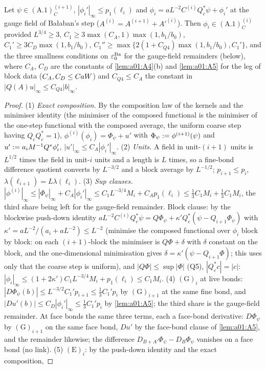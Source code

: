\begin{lemma}\label{lem:a01:GC}
Let $\psi\in(\mathrm{A.1})^{(i+1)}_C$, $|\phi_i'|_\infty\le p_1(\ell_i)$ and $\phi_i=aL^{-2}C^{(i)}Q_c^*\psi+\phi_i'$ at the gauge field of Ba{\l}aban's step ($A^{(i)}=A^{(i+1)}+A'^{(i)}$). Then $\phi_i\in(\mathrm{A.1})^{(i)}_C$ provided $L^{3/4}\ge3$, $C_1\ge3\max(C_A,1)\max(1,b_1/b_0)$, $C_1'\ge3C_D\max(1,b_1/b_0)$, $C_1''\ge\max\{2(1+C_{Q4})\max(1,b_1/b_0),C_1'\}$, and the three smallness conditions on $\varepsilon_0^{\mathrm{Ba}}$ for the gauge-field remainders (below), where $C_A$, $C_D$ are the constants of \cref{lem:a01:A4}(b) and \cref{lem:a01:A5} for the leg of block data ($C_A,C_D\le CaW$) and $C_{Q4}\le C_A$ the constant in $|Q(A)u|_\infty\le C_{Q4}|b|_\infty$.
\end{lemma}
\begin{proof}
(1) \emph{Exact composition.} By the composition law of the kernels and the minimiser identity (the minimiser of the composed functional is the minimiser of the one-step functional with the composed average, the uniform coarse step having $Q_cQ_c^*=1$), $\phi^{(i)}(\phi_i)=\Phi_\psi+u'$ with $\Phi_\psi:=\phi^{(i+1)}(\psi)$ and $u':= a_iM^{-1}Q^*\phi_i'$, $|u'|_\infty\le C_A|\phi_i'|_\infty$. (2) \emph{Units.} A field in unit-$(i+1)$ units is $L^{1/2}$ times the field in unit-$i$ units and a length is $L$ times, so a fine-bond difference quotient converts by $L^{-3/2}$ and a block average by $L^{-1/2}$; $p_{i+1}\le p_i$, $\lambda(\ell_{i+1})=L\lambda(\ell_i)$. (3) \emph{Sup clauses.} $|\phi^{(i)}|_\infty\le|\Phi_\psi|_\infty+C_A|\phi_i'|_\infty\le C_1L^{-3/4}M_i+C_Ap_1(\ell_i)\le\frac13C_1M_i+\frac13C_1M_i$, the third share being left for the gauge-field remainder. Block clause: by the blockwise push-down identity $aL^{-2}C^{(i)}Q_c^*\psi=Q\Phi_\psi+\kappa'Q_c^*(\psi-Q_{i+1}\Phi_\psi)$ with $\kappa'=aL^{-2}/(a_i+aL^{-2})\le L^{-2}$ (minimise the composed functional over $\phi_i$ block by block: on each $(i+1)$-block the minimiser is $Q\Phi+\delta$ with $\delta$ constant on the block, and the one-dimensional minimisation gives $\delta=\kappa'(\psi-Q_{i+1}\Phi)$; this uses only that the coarse step is uniform), and $|Q\Phi|\le\sup|\Phi|$ (Q5), $|Q_c^*c|=|c|$: $|\phi_i|_\infty\le(1+2\kappa')C_1L^{-3/4}M_i+p_1(\ell_i)\le C_1M_i$. (4) $(\mathrm G)_i$ at live bonds: $|D\Phi_\psi(b)|\le L^{-3/2}C_1'p_{i+1}\le\frac13C_1'p_i$ by $(\mathrm G)_{i+1}$ at the same fine bond, and $|Du'(b)|\le C_D|\phi_i'|_\infty\le\frac13C_1'p_i$ by \cref{lem:a01:A5}; the third share is the gauge-field remainder. At face bonds the same three terms, each a face-bond derivative: $D\Phi_\psi$ by $(\mathrm G)_{i+1}$ on the same face bond, $Du'$ by the face-bond clause of \cref{lem:a01:A5}, and the remainder likewise; the difference $D_{B+A'}\Phi_\psi-D_B\Phi_\psi$ vanishes on a face bond (no link). (5) $(\mathrm E)_i$: by the push-down identity and the exact composition,

\end{proof}

